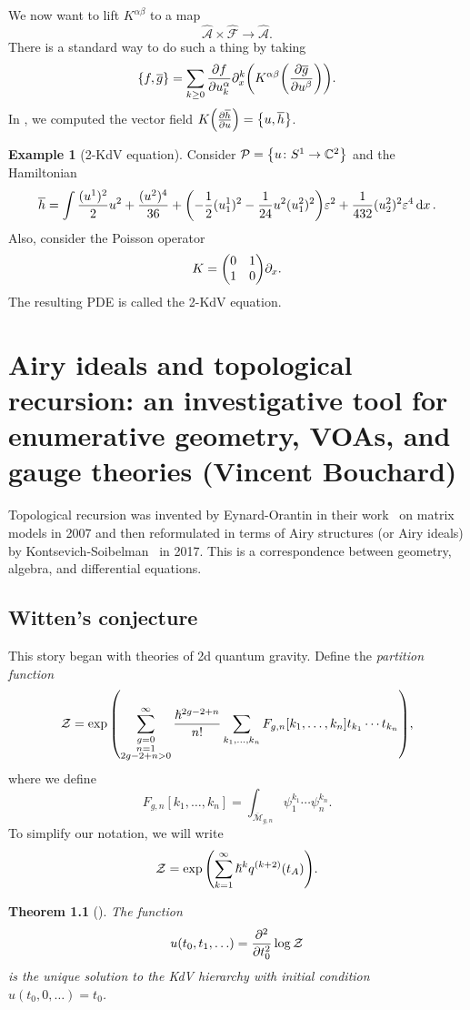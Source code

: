 \documentclass[leqno, openany]{memoir}
\newtheorem{thm}{Theorem}[section]
\theoremstyle{definition}
\newtheorem{exm}[thm]{Example}
\theoremstyle{remark}
\theoremstyle{plain}
\theoremstyle{definition}
\theoremstyle{remark}
\newcommand{\C}{\mathbb{C}}
\newcommand{\ep}{\varepsilon}
\newcommand{\mc}[1]{\mathcal{#1}}
\newcommand{\ol}[1]{\overline{#1}}
\newcommand{\wh}[1]{\widehat{#1}}
\begin{document}
We now want to lift $K^{\alpha\beta}$ to a map
\[ \wh{\mc{A}} \times \wh{\mc{F}} \to \wh{\mc{A}}. \]
There is a standard way to do such a thing by taking
\[ \qty{f, \ol{g}} = \sum_{k \geq 0} \pdv{f}{u_k^{\alpha}} \partial_x^k \qty(K^{\alpha\beta} \qty(\pdv{\ol{g}}{u^{\beta}})). \]
In , we computed the vector field $K \qty(\pdv{\ol{h}}{u}) = \qty{u, \ol{h}}$.

\begin{exm}[2-KdV equation]
    Consider $\mc{P} = \qty{u \colon S^1 \to \C^2}$ and the Hamiltonian
    \[ \ol{h} = \int \frac{(u^1)^2}{2} u^2 + \frac{(u^2)^4}{36} + \qty(-\frac{1}{2} (u_1^1)^2 - \frac{1}{24} u^2 (u_1^2)^2)\ep^2 + \frac{1}{432} (u_2^2)^2 \ep^4 \dd{x}. \]
    Also, consider the Poisson operator
    \[ K = \mqty(0 & 1 \\ 1 & 0) \partial_x. \]
    The resulting PDE is called the 2-KdV equation.
\end{exm}


\chapter{Airy ideals and topological recursion: an investigative tool for enumerative geometry, VOAs, and gauge theories (Vincent Bouchard)}%

Topological recursion was invented by Eynard-Orantin in their work~\cite{toprecursion} on matrix models in 2007 and then reformulated in terms of Airy structures (or Airy ideals) by Kontsevich-Soibelman~\cite{airytoprec} in 2017. This is a correspondence between geometry, algebra, and differential equations.

\section{Witten's conjecture}

This story began with theories of 2d quantum gravity.
Define the \textit{partition function}
\[ \mc{Z} = \exp \qty(\sum_{\substack{g=0 \\ n=1 \\ 2g-2+n>0}}^{\infty} \frac{\hslash^{2g-2+n}}{n!} \sum_{k_1, \ldots, k_n} F_{g,n}[k_1, \ldots, k_n] t_{k_1} \cdots t_{k_n}), \]
where we define
\[ F_{g,n}[k_1, \ldots, k_n] = \int_{\ol{\mc{M}}_{g,n}} \psi_1^{k_1} \cdots \psi_n^{k_n}. \]
To simplify our notation, we will write
\[ \mc{Z} = \exp \qty(\sum_{k=1}^{\infty} \hslash^k q^{(k+2)}(t_A)). \]

\begin{thm}[\cite{wittenconj}]\label{thm:witten}
    The function
    \[ u(t_0, t_1, \ldots) = \pdv[2]{t_0} \log \mc{Z} \]
    is the unique solution to the KdV hierarchy with initial condition $u(t_0, 0, \ldots) = t_0$.
\end{thm}
\end{document}
